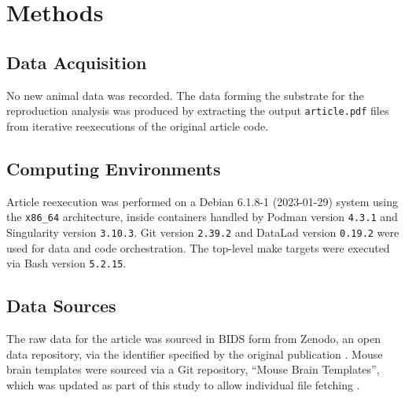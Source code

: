 \section{Methods}


\subsection{Data Acquisition}

No new animal data was recorded.
The data forming the substrate for the reproduction analysis was produced by extracting the output \texttt{article.pdf} files from iterative reexecutions of the original article code.

\subsection{Computing Environments}
Article reexecution was performed on a Debian 6.1.8-1 (2023-01-29) system using the \texttt{x86\_64} architecture, inside containers handled by Podman version \texttt{4.3.1} and Singularity version \texttt{3.10.3}.
Git version \texttt{2.39.2} and DataLad version \texttt{0.19.2} were used for data and code orchestration.
The top-level make targets were executed via Bash version \texttt{5.2.15}.

\subsection{Data Sources}
The raw data for the article was sourced in BIDS form from Zenodo, an open data repository, via the identifier specified by the original publication \cite{opfvta_bidsdata}.
Mouse brain templates were sourced via a Git repository, “Mouse Brain Templates”, which was updated as part of this study to allow individual file fetching \cite{mbt10}.

